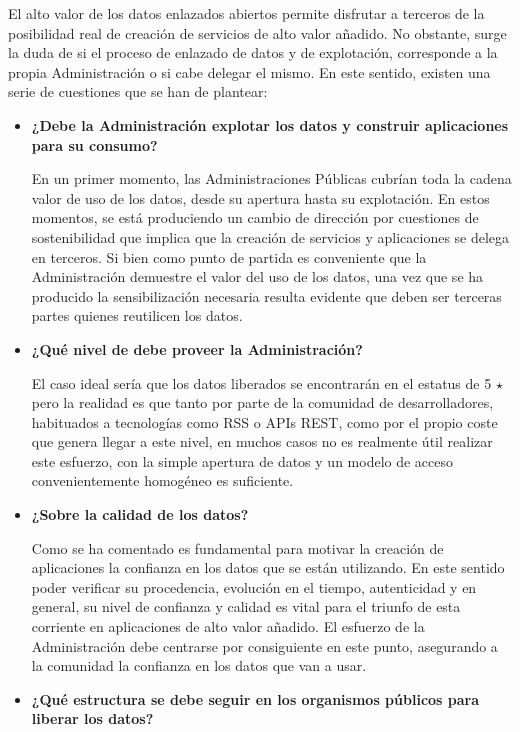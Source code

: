El alto valor de los datos enlazados abiertos permite disfrutar a terceros de la posibilidad real 
de creación de servicios de alto valor añadido. No obstante, surge la duda de si el proceso de enlazado de datos
y de explotación, corresponde a la propia Administración o si cabe delegar el mismo. En este sentido, existen
una serie de cuestiones que se han de plantear:
\begin{itemize}
 \item \textbf{¿Debe la Administración explotar los datos y construir aplicaciones para su consumo?} 

En un primer momento, las Administraciones Públicas cubrían toda la cadena valor de uso de los datos, desde su apertura hasta su explotación. En estos momentos, se está produciendo
un cambio de dirección por cuestiones de sostenibilidad que implica que la creación de servicios y aplicaciones se delega en terceros. Si bien
como punto de partida es conveniente que la Administración demuestre el valor del uso de los datos, una vez que se ha producido
la sensibilización necesaria resulta evidente que deben ser terceras partes quienes reutilicen los datos.


\item \textbf{¿Qué nivel de \linkeddata debe proveer la Administración?} 

El caso ideal sería que los datos liberados se encontrarán en el estatus de 5 $\star$ pero la realidad es que tanto por parte de la comunidad de desarrolladores, habituados
a tecnologías como \gls{RSS} o APIs \gls{REST}, como por el propio coste
que genera llegar a este nivel, en muchos casos no es realmente útil realizar este esfuerzo, con la simple apertura de datos
y un modelo de acceso convenientemente homogéneo es suficiente.


\item \textbf{¿Sobre la calidad de los datos?}

Como se ha comentado es fundamental para motivar la creación de aplicaciones la confianza en los datos que se están utilizando. En este sentido poder verificar su procedencia, evolución en el tiempo, autenticidad
y en general, su nivel de confianza y calidad es vital para el triunfo de esta corriente en aplicaciones de alto valor añadido. El esfuerzo
de la Administración debe centrarse por consiguiente en este punto, asegurando a la comunidad la confianza en los datos
que van a usar.


\item \textbf{¿Qué estructura se debe seguir en los organismos públicos para liberar los datos?}



\end{itemize}
